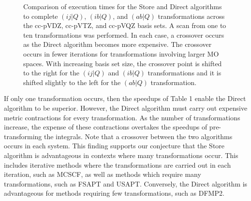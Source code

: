 \begin{figure}[H]
  \hfill
  \caption{Comparison of execution times for the Store and Direct algorithms to complete $(ij|Q)$, $(ib|Q)$, and $(ab|Q)$ transformations
across the cc-pVDZ, cc-pVTZ, and cc-pVQZ basis sets. A scan from one to ten transformations was performed. In each case, a crossover
occurs as the Direct algorithm becomes more expensive. The crossover occurs in fewer iterations for transformations involving larger MO spaces.
With increasing basis set size, the crossover point is shifted to the right for the $(ij|Q)$ and $(ib|Q)$
transformations and it is shifted slightly to the left for the $(ab|Q)$ transformation.}
\end{figure}

If only one transformation occurs, then the speedups of Table 1 enable the Direct algorithm to be superior. 
However, the Direct algorithm must carry out expensive metric contractions for every transformation. As the
number of transformations increase, the expense of these contractions
overtakes the speedups of pre-transforming the integrals. Note that a crossover between the two algorithms occurs in each system. 
This finding supports our conjecture that the Store algorithm is advantageous in contexts where many transformations occur. 
This includes iterative methods where the transformations
are carried out in each iteration, such as MCSCF, as well as methods which require many transformations, such as FSAPT and 
USAPT. Conversely, the Direct algorithm is advantageous for methods
requiring few transformations, such as DFMP2.


